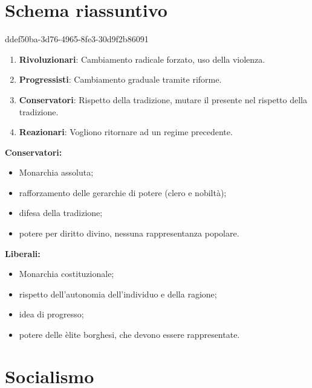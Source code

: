 \documentclass[preview]{standalone}
\begin{document}
\section{Schema riassuntivo}

\begin{snippet}{ddef50ba-3d76-4965-8fe3-30d9f2b86091}
    \begin{enumerate}
        \item \textbf{Rivoluzionari}: Cambiamento radicale forzato, uso della violenza.
        \item \textbf{Progressisti}: Cambiamento graduale tramite riforme.
        \item \textbf{Conservatori}: Rispetto della tradizione, mutare il presente nel rispetto della tradizione.
        \item \textbf{Reazionari}: Vogliono ritornare ad un regime precedente.
    \end{enumerate}
    
    \textbf{Conservatori:}
    \begin{itemize}
        \item Monarchia assoluta;
        \item rafforzamento delle gerarchie di potere (clero e nobiltà);
        \item difesa della tradizione;
        \item potere per diritto divino, nessuna rappresentanza popolare.
    \end{itemize}
    
    \textbf{Liberali:}
    \begin{itemize}
        \item Monarchia costituzionale;
        \item rispetto dell'autonomia dell'individuo e della ragione;
        \item idea di progresso;
        \item potere delle èlite borghesi, che devono essere rappresentate.
    \end{itemize}
\end{snippet}

\section{Socialismo}
\end{document}
